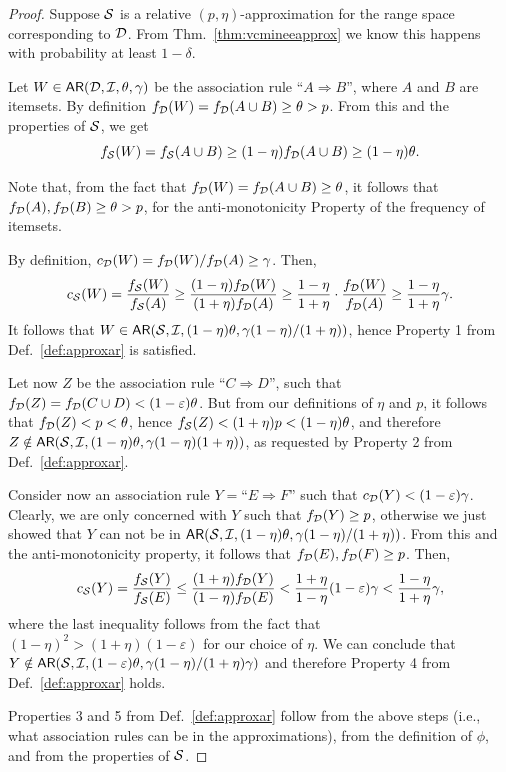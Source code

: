 \begin{proof}
  Suppose ${\cal S}$ is a relative $(p,\eta)$-approximation for the range space
  corresponding to ${\cal D}$. From Thm.~\ref{thm:vcmineeapprox} we know this happens with
  probability at least $1-\delta$.

 Let $W\in\mathsf{AR}({\cal D},{\cal I},\theta,\gamma)$ be the association rule ``$A\Rightarrow
 B$'', where $A$ and $B$ are itemsets. By definition $f_{\cal D}(W)=f_{\cal D}(A\cup
 B)\ge\theta> p$. From this and the properties of ${\cal S}$, we get
\[
 f_{\cal S}(W)=f_{\cal S}(A\cup B)\ge (1-\eta)f_{\cal D}(A\cup B)\ge (1-\eta)\theta.\] 

Note that, from the fact that $f_{\cal D}(W)=f_{\cal D}(A\cup B)\ge\theta$, it follows
that $f_{\cal D}(A),f_{\cal D}(B)\ge\theta> p$, for the anti-monotonicity Property of the
frequency of itemsets.

By definition, $c_{\cal D}(W)=f_{\cal D}(W)/f_{\cal D}(A)\ge\gamma$. Then,
 \[
 c_{\cal S}(W)=\frac{f_{\cal S}(W)}{f_{\cal S}(A)}\ge
 \frac{(1-\eta)f_{\cal D}(W)}{(1+\eta)f_{\cal D}(A)}\ge\frac{1-\eta}{1+\eta}\cdot\frac{f_{\cal D}(W)}{f_{\cal D}(A)}\ge\frac{1-\eta}{1+\eta}\gamma.\]
 It follows that
 $W\in\mathsf{AR}({\cal S},{\cal I},(1-\eta)\theta,\gamma(1-\eta)/(1+\eta))$, hence
 Property 1 from Def.~\ref{def:approxar} is satisfied.

 Let now $Z$ be the association rule ``$C\Rightarrow D$'', such that
 $f_{\cal D}(Z)=f_{\cal D}(C\cup D)<(1-\varepsilon)\theta$. But from our definitions of
 $\eta$ and $p$, it follows that $f_{\cal D}(Z) < p < \theta$, hence $f_{\cal S}(Z) <
 (1+\eta)p < (1-\eta)\theta$, and therefore
 $Z\notin\mathsf{AR}({\cal S},{\cal I},(1-\eta)\theta,\gamma(1-\eta)(1+\eta))$, as
 requested by Property 2 from Def.~\ref{def:approxar}.
 
 Consider now an association rule $Y=\mbox{``}E\Rightarrow F\mbox{''}$ such that
 $c_{\cal D}(Y)<(1-\varepsilon)\gamma$. Clearly, we are only concerned with $Y$ such
 that $f_{\cal D}(Y)\ge p$, otherwise we just showed that $Y$ can not be in
 $\mathsf{AR}({\cal S},{\cal I},(1-\eta)\theta,\gamma(1-\eta)/(1+\eta))$. From this and the
 anti-monotonicity property, it follows that $f_{\cal D}(E),f_{\cal D}(F)\ge p$. Then,
 \[
  c_{\cal S}(Y)=\frac{f_{\cal S}(Y)}{f_{\cal S}(E)}\le\frac{(1+\eta)f_{\cal D}(Y)}{(1-\eta)f_{\cal D}(E)}
  <\frac{1+\eta}{1-\eta} (1-\varepsilon)\gamma < \frac{1-\eta}{1+\eta}\gamma,\]
where the last inequality follows from the fact that
$(1-\eta)^2>(1+\eta)(1-\varepsilon)$ for our choice of $\eta$. We can
conclude that
$Y\notin\mathsf{AR}({\cal S},{\cal I},(1-\varepsilon)\theta,\gamma(1-\eta)/(1+\eta)\gamma)$ and
therefore Property 4 from Def.~\ref{def:approxar} holds.

  Properties 3 and 5 from Def.~\ref{def:approxar} follow from the above steps (i.e.,
  what association rules can be in the approximations), from the definition of
  $\phi$, and from the properties of ${\cal S}$.
\end{proof}

